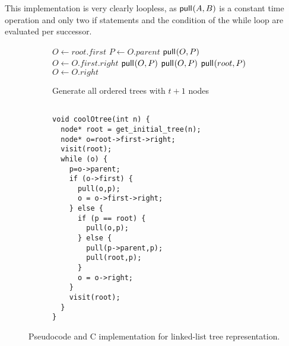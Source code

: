     This implementation is very clearly loopless, as $\mathsf{pull}_{}(A,B)$ is a constant time operation and only two if statements and the condition of the while loop are evaluated per successor.


\begin{figure}[H]
    \centering
    \begin{subfigure}[t]{.49 \textwidth}
	\begin{center}
	    \begin{algorithm}[H] %
	    \begin{algorithmic}
	\State $O\gets root.first$
	\State {}
	    \State $P \gets O.parent$
		\State $\mathsf{pull}_{}(O,P)$
		\State $O \gets O.first.right$
	    \Else
		\State $\mathsf{pull}_{}(O,P)$
		\Else
		\State $\mathsf{pull}_{}(O,P)$
		\State $\mathsf{pull}_{}(root,P)$
		\EndIf
		\State $O \gets O.right$
	    \EndIf
	\State {}
        \EndWhile
    \EndFunction
	    \end{algorithmic}
    \caption*{Generate all ordered trees with $t+1$ nodes}
	\end{algorithm}
	\end{center}
	\label{fig:}
    \end{subfigure}
    \begin{subfigure}[t]{.5 \textwidth}
	\begin{center}
	    \vspace{.9em} %
\begin{Verbatim}[commandchars=\\\[\]]

void coolOtree(int n) {
  node* root = get_initial_tree(n);
  node* o=root->first->right;
  visit(root);
  while (o) {
    p=o->parent;
    if (o->first) {
      pull(o,p);
      o = o->first->right;
    } else {
      if (p == root) {
        pull(o,p);
      } else {
        pull(p->parent,p);
        pull(root,p);
      }
      o = o->right;
    }
    visit(root);
  }
}

\end{Verbatim}
	\end{center}
	\label{fig:}
    \end{subfigure}
    \cprotect\caption{Pseudocode and C implementation for linked-list tree representation.}
    \label{fig:otreeCode}
\end{figure}

